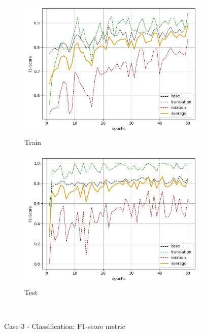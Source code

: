 \begin{figure}[H]
    \begin{subfigure}{.48\linewidth}
    \centering
    \includegraphics[scale=0.45]{Img/cls_flow_nonoise_train_f1.png}
    \caption{Train}
    \end{subfigure}
    \begin{subfigure}{.48\linewidth}
    \centering
    \includegraphics[scale=0.45]{Img/cls_flow_nonoise_test_f1.png}
    \caption{Test}
    \end{subfigure}\\
    \caption{Case 3 - Classification: F1-score metric}
\end{figure}



